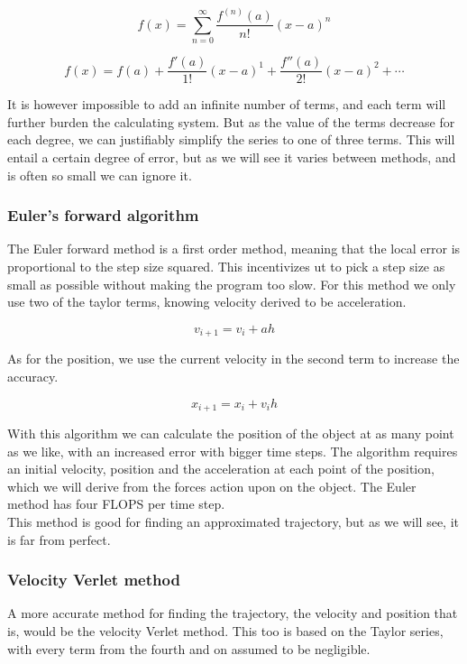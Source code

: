 \documentclass[10pt]{article}
\begin{document}
\begin{multicols}{2}
\begin{equation}
   f(x) =  \sum_{n=0}^\infty\frac{f^{(n)}(a)}{n!}(x-a)^n
\end{equation}

\begin{equation}
    f(x) = f(a)+ \frac{f'(a)}{1!}(x-a)^1+\frac{f''(a)}{2!}(x-a)^2+\cdots
\end{equation}

It is however impossible to add an infinite number of terms, and each term
will further burden the calculating system. But as the value of the terms
decrease for each degree, we can justifiably simplify the series to one of
three terms. This will entail a certain degree of error, but as we will see
it varies between methods, and is often so small we can ignore it.

\subsubsection{Euler's forward algorithm}
The Euler forward method is a first order method, meaning that the local
error is proportional to the step size squared. This incentivizes ut to
pick a step size as small as possible without making the program too slow.
For this method we only use two of the taylor terms, knowing velocity
derived to be acceleration.  

\begin{equation}
    v_{i+1} = v_i +ah
\end{equation}

As for the position, we use the current velocity in the second term to
increase the accuracy.

\begin{equation}
    x_{i+1} = x_i +v_{i}h
\end{equation}

With this algorithm we can calculate the position of the object at as many
point as we like, with an increased error with bigger time steps. The
algorithm requires an initial velocity, position and the acceleration at
each point of the position, which we will derive from the forces action
upon on the object. The Euler method has four FLOPS per time step.\\

This method is good for finding an approximated trajectory, but as we will
see, it is far from perfect.


\subsubsection{Velocity Verlet method}
A more accurate method for finding the trajectory, the velocity and
position that is, would be the velocity Verlet method. This too is based on
the Taylor series, with every term from the fourth and on assumed to be
negligible.


\end{multicols}
\end{document}
